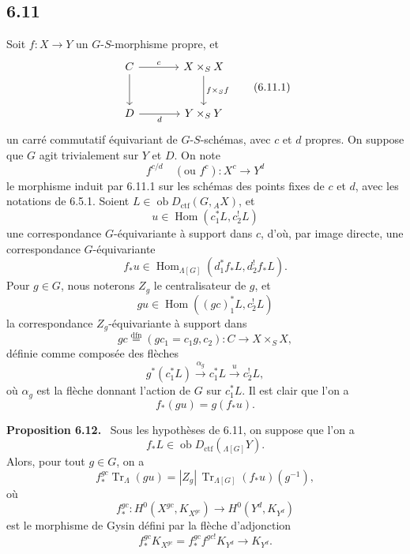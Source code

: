 \documentclass[11pt]{article}
\newenvironment{statement}[1]{\par\medskip\noindent\textbf{#1.}\ }{\par\medskip}
\DeclareMathOperator{\Hom}{Hom}
\providecommand{\Tr}{\operatorname{Tr}}
\providecommand{\Tr}{\operatorname{Tr}}
\providecommand{\Ob}{\operatorname{ob}}
\providecommand{\Tr}{\operatorname{Tr}}
\providecommand{\Hom}{\operatorname{Hom}}
\providecommand{\Ob}{\operatorname{ob}}
\providecommand{\Tr}{\operatorname{Tr}}
\providecommand{\Ob}{\operatorname{Ob}}
\begin{document}
\subsection*{6.11}
Soit $f:X\to Y$ un $G$-$S$-morphisme propre, et
\begin{equation}
\begin{tikzcd}[column sep=large,row sep=large]
C \arrow[r,"c"] \arrow[d] & X\times_SX \arrow[d,"f\times_Sf"]\\
D \arrow[r,"d"'] & Y\times_SY
\end{tikzcd}
\tag{6.11.1}
\end{equation}
un carré commutatif équivariant de $G$-$S$-schémas, avec $c$ et $d$ propres. On suppose que $G$ agit trivialement sur $Y$ et $D$. On note
\begin{equation}
f^{c/d}\quad(\text{ou } f^c):X^c\longrightarrow Y^d
\tag{6.11.2}
\end{equation}
le morphisme induit par 6.11.1 sur les schémas des points fixes de $c$ et $d$, avec les notations de 6.5.1. Soient $L\in\Ob D_{\mathrm{ctf}}(G,{}_AX)$, et
\[
u\in\Hom(c_1^*L,c_2^!L)
\]
une correspondance $G$-équivariante à support dans $c$, d'où, par image directe, une correspondance $G$-équivariante
\[
f_*u\in\Hom_{\Lambda[G]}(d_1^*f_*L,d_2^!f_*L).
\]
Pour $g\in G$, nous noterons $Z_g$ le centralisateur de $g$, et
\begin{equation}
gu\in\Hom((gc)_1^*L,c_2^!L)
\tag{6.11.3}
\end{equation}
la correspondance $Z_g$-équivariante à support dans
\begin{equation}
gc\stackrel{\mathrm{dfn}}{=}(gc_1=c_1g,c_2):C\to X\times_SX,
\tag{6.11.4}
\end{equation}
définie comme composée des flèches
\[
g^*(c_1^*L)\xrightarrow{\alpha_g}c_1^*L\xrightarrow{u}c_2^!L,
\]
où $\alpha_g$ est la flèche donnant l'action de $G$ sur $c_1^*L$. Il est clair que l'on a
\begin{equation}
f_*(gu)=g(f_*u).
\tag{6.11.5}
\end{equation}

\begin{statement}{Proposition 6.12}
Sous les hypothèses de 6.11, on suppose que l'on a
\[
f_*L\in\Ob D_{\mathrm{ctf}}({}_{\Lambda[G]}Y).
\]
Alors, pour tout $g\in G$, on a
\begin{equation}
f_*^{gc}\Tr_{\Lambda}(gu)
=
|Z_g|\,\Tr_{\Lambda[G]}(f_*u)(g^{-1}),
\tag{6.12.1}
\end{equation}
où
\[
f_*^{gc}:H^0(X^{gc},K_{X^{gc}})\longrightarrow H^0(Y^d,K_{Y^d})
\]
est le morphisme de Gysin défini par la flèche d'adjonction
\[
f_*^{gc}K_{X^{gc}}=f_*^{gc}f^{gc!}K_{Y^d}\longrightarrow K_{Y^d}.
\]
\end{statement}
\end{document}
